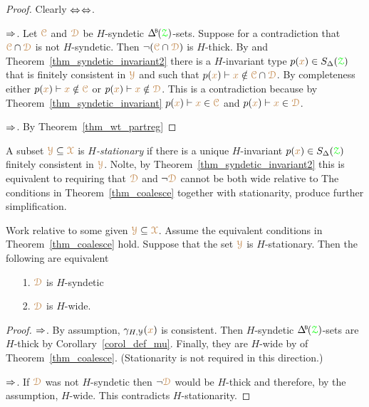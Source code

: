 \begin{proof}
  Clearly $\Leftrightarrow$$\Leftrightarrow$.

  $\Rightarrow$.
  Let ${\color{brown}\EuScript C}$ and ${\color{brown}\EuScript D}$ be $H$-syndetic $\BDelta({\grZ})$-sets.
  Suppose for a contradiction that ${\color{brown}\EuScript C}\cap{\color{brown}\EuScript D}$ is not $H$-syndetic.
  Then $\neg({\color{brown}\EuScript C}\cap{\color{brown}\EuScript D})$ is $H$-thick.
  By  and Theorem~\ref{thm_syndetic_invariant2} there is a $H$-invariant type $p({\color{brown} x})\in S_\Delta({\color{green}\EuScript Z})$ that is finitely consistent in ${\color{brown}\EuScript Y}$ and such that $p({\color{brown} x})\vdash{\color{brown}x}\notin{\color{brown}\EuScript C}\cap{\color{brown}\EuScript D}$.
  By completeness either $p({\color{brown} x})\vdash{\color{brown}x}\notin{\color{brown}\EuScript C}$ or $p({\color{brown} x})\vdash{\color{brown}x}\notin{\color{brown}\EuScript D}$.
  This is a contradiction because by Theorem~\ref{thm_syndetic_invariant} $p({\color{brown} x})\vdash{\color{brown}x}\in{\color{brown}\EuScript C}$ and $p({\color{brown} x})\vdash{\color{brown}x}\in{\color{brown}\EuScript D}$.


  $\Rightarrow$. By Theorem~\ref{thm_wt_partreg}
\end{proof}

A subset ${\color{brown}\EuScript Y}\subseteq{\color{brown}\EuScript X}$ is \emph{$H$-stationary\/} if there is a unique $H$-invariant $p({\color{brown} x})\in S_\Delta({\color{green}\EuScript Z})$ finitely consistent in ${\color{brown}\EuScript Y}$.
Nolte, by Theorem~\ref{thm_syndetic_invariant2} this is equivalent to requiring that ${\color{brown}\EuScript D}$ and $\neg{\color{brown}\EuScript D}$ cannot be both wide relative to
The conditions in Theorem~\ref{thm_coalesce} together with stationarity, produce further simplification.

\begin{fact}\label{fact_starionarity_thick_syndetic}
  Work relative to some given ${\color{brown}\EuScript Y}\subseteq{\color{brown}\EuScript X}$.
  Assume the equivalent conditions in Theorem~\ref{thm_coalesce} hold.
  Suppose that the set ${\color{brown}\EuScript Y}$ is $H$-stationary.
  Then the following are equivalent
  \begin{itemize}
    \item [1.] ${\color{brown}\EuScript D}$ is $H$-syndetic
    \item [2.] ${\color{brown}\EuScript D}$ is $H$-wide.
  \end{itemize}\smallskip
\end{fact}

\begin{proof}
  $\Rightarrow$.
  By assumption, $\gamma_{H,\EuScript Y}({\color{brown} x})$ is consistent.
  Then $H$-syndetic $\BDelta({\grZ})$-sets are $H$-thick by Corollary~\ref{corol_def_mu}.
  Finally, they are  $H$-wide by  of Theorem~\ref{thm_coalesce}.
  (Stationarity is not required in this direction.)

  $\Rightarrow$.
  If ${\color{brown}\EuScript D}$ was not $H$-syndetic then $\neg{\color{brown}\EuScript D}$ would be $H$-thick and therefore, by the assumption, $H$-wide.
  This contradicts $H$-stationarity.
\end{proof}


